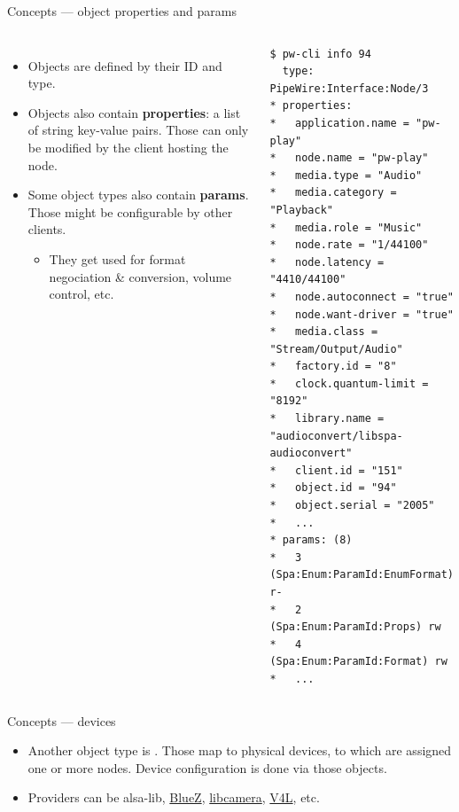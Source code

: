 \begin{frame}[fragile]{Concepts — object properties and params}
  \begin{columns}

      \begin{itemize}
      \item Objects are defined by their ID and type.

      \item Objects also contain \textbf{properties}: a list of string
        key-value pairs. Those can only be modified by the client
        hosting the node.

      \item Some object types also contain \textbf{params}. Those might
        be configurable by other clients.

        \begin{itemize}
        \item They get used for format negociation \& conversion,
          volume control, etc.
        \end{itemize}
      \end{itemize}

    \begin{block}{}
      \fontsize{8}{8}\selectfont
        \begin{verbatim}
$ pw-cli info 94
  type: PipeWire:Interface:Node/3
* properties:
*   application.name = "pw-play"
*   node.name = "pw-play"
*   media.type = "Audio"
*   media.category = "Playback"
*   media.role = "Music"
*   node.rate = "1/44100"
*   node.latency = "4410/44100"
*   node.autoconnect = "true"
*   node.want-driver = "true"
*   media.class = "Stream/Output/Audio"
*   factory.id = "8"
*   clock.quantum-limit = "8192"
*   library.name = "audioconvert/libspa-audioconvert"
*   client.id = "151"
*   object.id = "94"
*   object.serial = "2005"
*   ...
* params: (8)
*   3 (Spa:Enum:ParamId:EnumFormat) r-
*   2 (Spa:Enum:ParamId:Props) rw
*   4 (Spa:Enum:ParamId:Format) rw
*   ...
        \end{verbatim}
      \end{block}

  \end{columns}
\end{frame}



\begin{frame}{Concepts — devices}
  \begin{itemize}

  \item Another object type is . Those map to physical
    devices, to which are assigned one or more nodes. Device
    configuration is done via those objects.

  \item Providers can be alsa-lib, \href{http://www.bluez.org/}{BlueZ},
    \href{https://libcamera.org/}{libcamera},
    \href{https://en.wikipedia.org/wiki/Video4Linux}{V4L}, etc.

  \end{itemize}
\end{frame}



